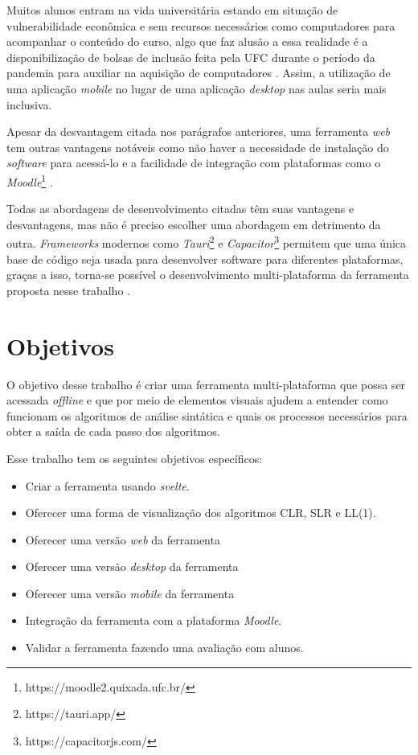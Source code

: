 Muitos alunos entram na vida universitária estando em situação de vulnerabilidade econômica e sem recursos necessários como computadores para acompanhar o conteúdo do curso, algo que faz alusão a essa realidade é a disponibilização de bolsas de inclusão feita pela UFC durante o período da pandemia para auxiliar na aquisição de computadores \cite{povo_ufc_2020}. Assim, a utilização de uma aplicação \textit{mobile} no lugar de uma aplicação \textit{desktop} nas aulas seria mais inclusiva.

Apesar da desvantagem citada nos parágrafos anteriores, uma ferramenta \textit{web} tem outras vantagens notáveis como não haver a necessidade de instalação do \textit{software} para acessá-lo e a facilidade de integração com plataformas como o \textit{Moodle}\footnote{https://moodle2.quixada.ufc.br/} \cite{desai_web_2022}.

Todas as abordagens de desenvolvimento citadas têm suas vantagens e desvantagens, mas não é preciso  escolher uma abordagem em detrimento da outra. \textit{Frameworks} modernos como \textit{Tauri}\footnote{https://tauri.app/} e \textit{Capacitor}\footnote{https://capacitorjs.com/} permitem que uma única base de código seja usada para desenvolver software para diferentes plataformas, graças a isso, torna-se possível o desenvolvimento multi-plataforma da ferramenta proposta nesse trabalho \cite{shevtsiv2021cross}.

\section{Objetivos}
O objetivo desse trabalho é criar uma ferramenta multi-plataforma que possa ser acessada \textit{offline} e que por meio de elementos visuais ajudem a entender como funcionam os algoritmos de análise sintática e quais os processos necessários para obter a saída de cada passo dos algoritmos.

Esse trabalho tem os seguintes objetivos específicos:
\begin{itemize}[label=$\sbullet$]
    \item Criar a ferramenta usando \textit{svelte}.
    \item Oferecer uma forma de visualização dos algoritmos CLR, SLR e LL(1).
    \item Oferecer uma versão \textit{web} da ferramenta
    \item Oferecer uma versão \textit{desktop} da ferramenta
    \item Oferecer uma versão \textit{mobile} da ferramenta
    \item Integração da ferramenta com a plataforma \textit{Moodle}.
    \item Validar a ferramenta fazendo uma avaliação com alunos.
\end{itemize}

